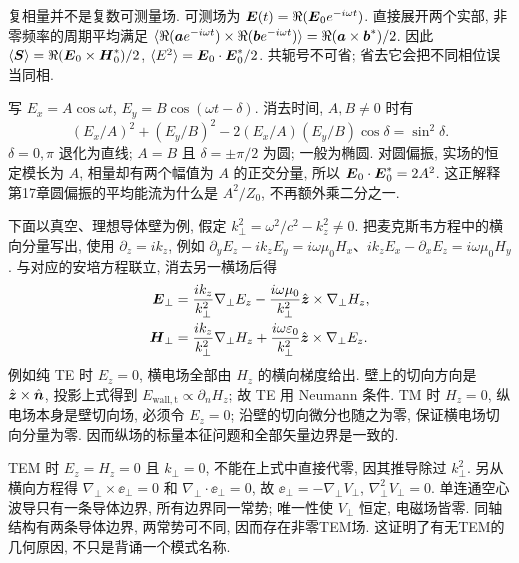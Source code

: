 复相量并不是复数可测量场. 可测场为 $\boldsymbol{E}(t)=\Re(\boldsymbol{E}_0e^{-i\omega t})$. 直接展开两个实部, 非零频率的周期平均满足
$\langle\Re(\boldsymbol{a} e^{-i\omega t})\times\Re(\boldsymbol{b} e^{-i\omega t})\rangle=\Re(\boldsymbol{a}\times\boldsymbol{b}^*)/2$.
因此 $\langle\boldsymbol{S}\rangle=\Re(\boldsymbol{E}_0\times\boldsymbol{H}_0^*)/2$, $\langle E^2\rangle=\boldsymbol{E}_0\cdot\boldsymbol{E}_0^*/2$. 共轭号不可省; 省去它会把不同相位误当同相.

写 $E_x=A\cos\omega t$, $E_y=B\cos(\omega t-\delta)$. 消去时间, $A,B\ne0$ 时有
\[
 (E_x/A)^2+(E_y/B)^2-2(E_x/A)(E_y/B)\cos\delta=\sin^2\delta.
\]
$\delta=0,\pi$ 退化为直线; $A=B$ 且 $\delta=\pm\pi/2$ 为圆; 一般为椭圆. 对圆偏振, 实场的恒定模长为 $A$, 相量却有两个幅值为 $A$ 的正交分量, 所以 $\boldsymbol{E}_0\cdot\boldsymbol{E}_0^*=2A^2$. 这正解释第17章圆偏振的平均能流为什么是 $A^2/Z_0$, 不再额外乘二分之一.

下面以真空、理想导体壁为例, 假定 $k_\perp^2=\omega^2/c^2-k_z^2\ne0$. 把麦克斯韦方程中的横向分量写出, 使用 $\partial_z=ik_z$, 例如
$\partial_yE_z-ik_zE_y=i\omega\mu_0H_x$、$ik_zE_x-\partial_xE_z=i\omega\mu_0H_y$.
与对应的安培方程联立, 消去另一横场后得
\begin{align*}
 \boldsymbol{E}_\perp&=\frac{ik_z}{k_\perp^2}\nabla_\perp E_z
 -\frac{i\omega\mu_0}{k_\perp^2}\hat{\boldsymbol{z}}\times\nabla_\perp H_z,\\
 \boldsymbol{H}_\perp&=\frac{ik_z}{k_\perp^2}\nabla_\perp H_z
 +\frac{i\omega\varepsilon_0}{k_\perp^2}\hat{\boldsymbol{z}}\times\nabla_\perp E_z.
\end{align*}
例如纯 TE 时 $E_z=0$, 横电场全部由 $H_z$ 的横向梯度给出. 壁上的切向方向是 $\hat{\boldsymbol{z}}\times\hat{\boldsymbol{n}}$, 投影上式得到 $E_\mathrm{wall,t}\propto\partial_nH_z$; 故 TE 用 Neumann 条件. TM 时 $H_z=0$, 纵电场本身是壁切向场, 必须令 $E_z=0$; 沿壁的切向微分也随之为零, 保证横电场切向分量为零. 因而纵场的标量本征问题和全部矢量边界是一致的.

TEM 时 $E_z=H_z=0$ 且 $k_\perp=0$, 不能在上式中直接代零, 因其推导除过 $k_\perp^2$. 另从横向方程得 $\nabla_\perp\times\ee_\perp=0$ 和 $\nabla_\perp\cdot\ee_\perp=0$, 故 $\ee_\perp=-\nabla_\perp V_\perp$, $\nabla_\perp^2V_\perp=0$. 单连通空心波导只有一条导体边界, 所有边界同一常势; 唯一性使 $V_\perp$ 恒定, 电磁场皆零. 同轴结构有两条导体边界, 两常势可不同, 因而存在非零TEM场. 这证明了有无TEM的几何原因, 不只是背诵一个模式名称.
